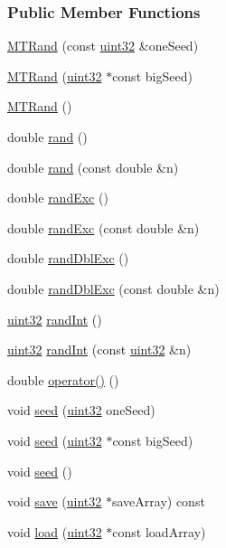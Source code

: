 \subsubsection*{Public Member Functions}
\begin{DoxyCompactItemize}
\item 
\hyperlink{class_m_t_rand_ab4f392e44228a583b7b1a3f036fb2fd0}{MTRand} (const \hyperlink{class_m_t_rand_a45478edf9e24dcd2a5164bac3889d6a2}{uint32} \&oneSeed)
\item 
\hyperlink{class_m_t_rand_a22fbca78adae1fb4ff1cb103d85498f4}{MTRand} (\hyperlink{class_m_t_rand_a45478edf9e24dcd2a5164bac3889d6a2}{uint32} $\ast$const bigSeed)
\item 
\hyperlink{class_m_t_rand_a265dc65546e26073c0d5f8787b045a1d}{MTRand} ()
\item 
double \hyperlink{class_m_t_rand_a76d129a2d850c24ff4a0613f299cf3a5}{rand} ()
\item 
double \hyperlink{class_m_t_rand_a7a47382fb7b19ae1f330691735dc800b}{rand} (const double \&n)
\item 
double \hyperlink{class_m_t_rand_afd05e468983b3a3d66ce0f403bd666af}{randExc} ()
\item 
double \hyperlink{class_m_t_rand_a2955abdb96e6cab97e50ac755d48dad1}{randExc} (const double \&n)
\item 
double \hyperlink{class_m_t_rand_a4d3a475aa72fe6d1a6d7d9e16d6a732e}{randDblExc} ()
\item 
double \hyperlink{class_m_t_rand_a587c90f52c35fa2bf05d34791dd5457e}{randDblExc} (const double \&n)
\item 
\hyperlink{class_m_t_rand_a45478edf9e24dcd2a5164bac3889d6a2}{uint32} \hyperlink{class_m_t_rand_ad1008efd4fe0e8aae30459c2c58cfe35}{randInt} ()
\item 
\hyperlink{class_m_t_rand_a45478edf9e24dcd2a5164bac3889d6a2}{uint32} \hyperlink{class_m_t_rand_a18ea21f615df06c9359c34d2eba6f252}{randInt} (const \hyperlink{class_m_t_rand_a45478edf9e24dcd2a5164bac3889d6a2}{uint32} \&n)
\item 
double \hyperlink{class_m_t_rand_abbb87a08d622d58fdee0eea4cb5471a0}{operator()} ()
\item 
void \hyperlink{class_m_t_rand_af79328bada053f0a75ec6575c56029b4}{seed} (\hyperlink{class_m_t_rand_a45478edf9e24dcd2a5164bac3889d6a2}{uint32} oneSeed)
\item 
void \hyperlink{class_m_t_rand_a38fd3ace842ddcbdaa534fb925442ecc}{seed} (\hyperlink{class_m_t_rand_a45478edf9e24dcd2a5164bac3889d6a2}{uint32} $\ast$const bigSeed)
\item 
void \hyperlink{class_m_t_rand_ad88ea3363d55bafb62826bbd130279c2}{seed} ()
\item 
void \hyperlink{class_m_t_rand_ad60e0f3f5c90baab75b74f9a2ccae871}{save} (\hyperlink{class_m_t_rand_a45478edf9e24dcd2a5164bac3889d6a2}{uint32} $\ast$saveArray) const 
\item 
void \hyperlink{class_m_t_rand_a8302e9a8cd16d8dfc536a85bf2f68be0}{load} (\hyperlink{class_m_t_rand_a45478edf9e24dcd2a5164bac3889d6a2}{uint32} $\ast$const loadArray)
\end{DoxyCompactItemize}

